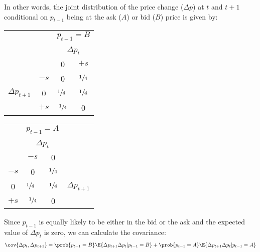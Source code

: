 \begin{solution}
    In other words, the joint distribution of the price change (\(\Delta p\)) at \(t\) and \(t+1\) conditional on \(p_{t-1}\) being at the ask (\(A\)) or bid (\(B\)) price is given by:
    \begin{table}[H]
        \centering
        \begingroup
        \color{nu purple}
        \begin{tabular}{cccc}
            & & \multicolumn{2}{c}{\(p_{t-1} = B\)} \\\\
            & & \multicolumn{2}{c}{\(\Delta p_{t}\)} \\
            & & 0 & \(+s\) \\ \cline{3-4} 
            & \multicolumn{1}{c|}{\(-s\)} & \multicolumn{1}{c|}{0}   & \multicolumn{1}{c|}{\(\sfrac{1}{4}\)} \\ \cline{3-4} 
    $\Delta p_{t+1}$ & \multicolumn{1}{c|}{0}  & \multicolumn{1}{l|}{\(\sfrac{1}{4}\)} & \multicolumn{1}{c|}{\(\sfrac{1}{4}\)} \\ \cline{3-4} 
            & \multicolumn{1}{c|}{\(+s\)} & \multicolumn{1}{c|}{\(\sfrac{1}{4}\)} & \multicolumn{1}{c|}{0}   \\ \cline{3-4} 
        \end{tabular}
        \qquad
        \begin{tabular}{cccc}
             & \multicolumn{2}{c}{\(p_{t-1} = A\)} & \\\\
             & \multicolumn{2}{c}{\(\Delta p_{t}\)} & \\
             & \(-s\) & 0 & \\ \cline{2-3} 
             \multicolumn{1}{c|}{\(-s\)} & \multicolumn{1}{c|}{0}   & \multicolumn{1}{c|}{\(\sfrac{1}{4}\)} & \\ \cline{2-3} 
      \multicolumn{1}{c|}{0}  & \multicolumn{1}{l|}{\(\sfrac{1}{4}\)} & \multicolumn{1}{c|}{\(\sfrac{1}{4}\)} & $\Delta p_{t+1}$ \\ \cline{2-3} 
             \multicolumn{1}{c|}{\(+s\)} & \multicolumn{1}{c|}{\(\sfrac{1}{4}\)} & \multicolumn{1}{c|}{0}  & \\ \cline{2-3} 
        \end{tabular}
        \endgroup
    \end{table}
    Since \(p_{t-1}\) is equally likely to be either in the bid or the ask and the expected value of \(\Delta p_t\) is zero, we can calculate the covariance:
    \begin{align*}
        \cov{\Delta p_{t}, \Delta p_{t+1}} & = \prob{p_{t-1}=B}\E{\Delta p_{t+1}\Delta p_{t} \vert p_{t-1}=B} + \prob{p_{t-1}=A}\E{\Delta p_{t+1}\Delta p_{t} \vert p_{t-1}=A} \\

\end{align*}
\end{solution}
